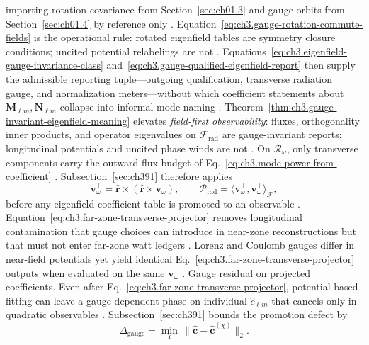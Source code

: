 importing rotation covariance from Section~\ref{sec:ch01.3} and gauge orbits from Section~\ref{sec:ch01.4} by reference only
\cite{belinfante1940}. Equation~\eqref{eq:ch3.gauge-rotation-commute-fields} is the operational rule: rotated eigenfield
tables are symmetry closure conditions; uncited potential relabelings are not \cite{harrington2001}. Equations~\eqref{eq:ch3.eigenfield-gauge-invariance-class}
and~\eqref{eq:ch3.gauge-qualified-eigenfield-report} then supply the admissible reporting tuple---outgoing qualification, transverse radiation gauge, and
normalization meters---without which coefficient statements about \(\mathbf{M}_{\ell m},\mathbf{N}_{\ell m}\) collapse into informal mode naming
\cite{stratton1941}. Theorem~\ref{thm:ch3.gauge-invariant-eigenfield-meaning} elevates \emph{field-first observability}: fluxes,
orthogonality inner products, and operator eigenvalues on \(\mathcal{F}_{\mathrm{rad}}\) are gauge-invariant reports; longitudinal potentials and
uncited phase winds are not \cite{belinfante1940}.
On \(\mathcal{R}_\omega\), only transverse components carry the outward flux budget of Eq.~\eqref{eq:ch3.mode-power-from-coefficient}
\cite{poynting1884}. Subsection~\ref{sec:ch391} therefore applies
\begin{equation}
\label{eq:ch3.far-zone-transverse-projector}
\mathbf{v}_\omega^{\perp}
=
\hat{\mathbf{r}}\times(\hat{\mathbf{r}}\times\mathbf{v}_\omega),
\qquad
\mathcal{P}_{\mathrm{rad}}
=
\langle \mathbf{v}_\omega^{\perp},\mathbf{v}_\omega^{\perp}\rangle_{\mathcal{F}},
\end{equation}
before any eigenfield coefficient table is promoted to an observable \cite{hansen1988}. Equation~\eqref{eq:ch3.far-zone-transverse-projector}
removes longitudinal contamination that gauge choices can introduce in near-zone reconstructions but that must not enter far-zone watt ledgers
\cite{belinfante1940}. Lorenz and Coulomb gauges differ in near-field potentials yet yield identical
Eq.~\eqref{eq:ch3.far-zone-transverse-projector} outputs when evaluated on the same \(\mathbf{v}_\omega\) \cite{stratton1941}.
Gauge residual on projected coefficients. Even after Eq.~\eqref{eq:ch3.far-zone-transverse-projector}, potential-based fitting can leave a gauge-dependent phase on individual
\(\widehat{c}_{\ell m}\) that cancels only in quadratic observables \cite{belinfante1940}. Subsection~\ref{sec:ch391}
bounds the promotion defect by
\begin{equation}
\label{eq:ch3.gauge-coefficient-residual}
\Delta_{\mathrm{gauge}}
=
\min_{\chi}\,
\bigl\|\widehat{\mathbf{c}}-\widehat{\mathbf{c}}^{(\chi)}\bigr\|_{2}.
\end{equation}

